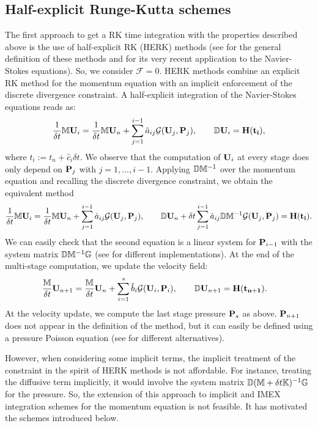 \subsection{Half-explicit Runge-Kutta schemes}

The first approach to get a RK time integration with the properties described above is the use of half-explicit RK (HERK) methods (see \cite{brasey_half-explicit_1993,arnold_half-explicit_1998,murua_partitioned_1997} for the general definition of these methods and \cite{sanderse_accuracy_2012} for its very recent application to the Navier-Stokes equations). So, we consider $\mathcal{F} = 0$. HERK methods combine an explicit RK method for the momentum equation with an implicit enforcement of the discrete divergence constraint. A half-explicit integration of the Navier-Stokes equations reads as:
\begin{align}
\label{eq-C6_IMEX_NS_iup_HE}
\frac{1}{\delta t}\M\U_i=\frac{1}{\delta t}\M\U_n + \sum_{j=1}^{i-1}\hat{a}_{ij} \mathcal{G} (\U_j,\P_j), \qquad
 \D \U_i = \H(t_i),
\end{align}
where $t_i := t_n + \hat{c}_{i}\delta t$. We observe that the computation of $\U_i$ at every stage does only depend on $\P_{j}$ with $j = 1, \ldots, i-1$. Applying $\D\M^{-1}$ over the momentum equation and recalling the discrete divergence constraint, we obtain the equivalent method
\begin{align}
\label{eq-C6_IMEX_NS_fup_HE}
\frac{1}{\delta t}\M\U_i=\frac{1}{\delta t}\M\U_n + \sum_{j=1}^{i-1}\hat{a}_{ij} \mathcal{G} (\U_j,\P_j), \qquad
\D \U_n + \delta t \sum_{j=1}^{i-1}\hat{a}_{ij} \D\M^{-1}\mathcal{G} (\U_j,\P_j) = \H(t_i).
\end{align}
We can easily check that the second equation is a linear system for $\P_{i-1}$ with the system matrix $\D\M^{-1}\G$ (see \cite{sanderse_accuracy_2012} for different implementations). At the end of the multi-stage computation, we update the velocity field:
\begin{align}
\label{eq-C6_IMEX_NS_u_n+1_he}
&\frac{\M}{\delta t}\U_{n+1}=\frac{\M}{\delta t}\U_n+\sum_{i=1}^s\hat{b}_i\mathcal{G}(\U_i,\P_i), \qquad \D \U_{n+1} = \H(t_{n+1}).
\end{align}
At the velocity update, we compute the last stage pressure $\P_s$ as above. $\P_{n+1}$ does not appear in the definition of the method, but it can easily be defined using a pressure Poisson equation (see \cite{sanderse_accuracy_2012} for different alternatives).

However, when considering some implicit terms, the implicit treatment of the constraint in the spirit of HERK methods is not affordable. For instance, treating the diffusive term implicitly, it would involve the system matrix  $\D (\M + \delta t \K)^{-1} \G$ for the pressure. So, the extension of this approach to implicit and IMEX integration schemes for the momentum equation is not feasible. It has motivated the schemes introduced below.
 
